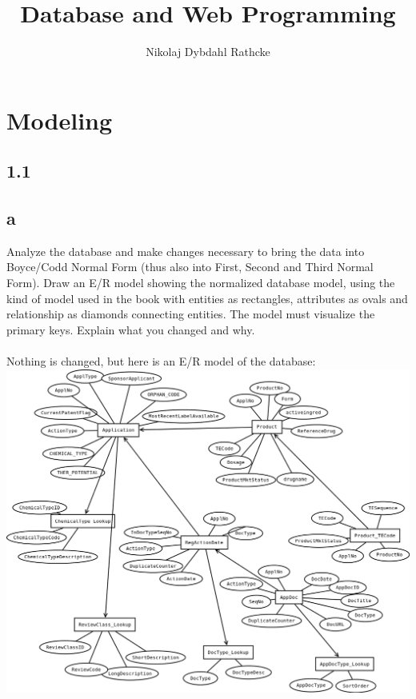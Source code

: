 \documentclass[12pt]{article}
\title{Database and Web Programming}
\author{Nikolaj Dybdahl Rathcke}
\begin{document}
\section*{Modeling}
\subsection*{1.1}
\subsection*{a}
Analyze the database and make changes necessary to bring the data into Boyce/Codd Normal Form (thus also into First, Second and Third Normal Form). Draw an E/R model showing the normalized database model, using the kind of model used in the book with entities as rectangles, attributes as ovals and relationship as diamonds connecting entities. The model must visualize the primary keys. Explain what you changed and why.\\
\\
Nothing is changed, but here is an E/R model of the database:
\\
\includegraphics[scale=0.3]{Diagram.png}
\end{document}

